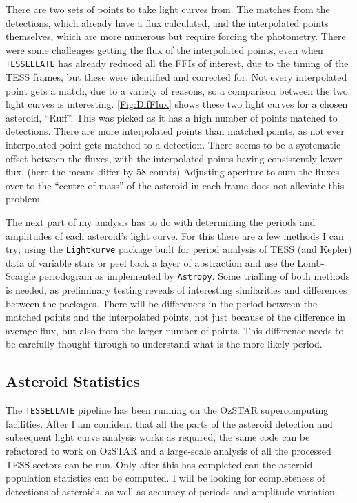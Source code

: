 \documentclass[12pt]{article}
\begin{document}
There are two sets of points to take light curves from. 
The matches from the detections, which already have a flux calculated, and the interpolated points themselves, which are more numerous but require forcing the photometry. 
There were some challenges getting the flux of the interpolated points, even when \texttt{TESSELLATE} has already reduced all the FFIs of interest, due to the timing of the TESS frames, but these were identified and corrected for.
Not every interpolated point gets a match, due to a variety of reasons, %
so a comparison between the two light curves is interesting. 
\autoref{Fig:DifFlux} shows these two light curves for a chosen asteroid, ``Ruff''. 
This was picked as it has a high number of points matched to detections.
There are more interpolated points than matched points, as not ever interpolated point gets matched to a detection.
There seems to be a systematic offset between the fluxes, with the interpolated points having consistently lower flux, (here the means differ by 58 counts)
Adjusting aperture to sum the fluxes over to the ``centre of mass'' of the asteroid in each frame does not alleviate this problem. 

The next part of my analysis has to do with determining the periods and amplitudes of each asteroid's light curve.
For this there are a few methods I can try; using the \texttt{Lightkurve} \citep{Lightkurve2018} package built for period analysis of TESS (and Kepler) data of variable stars or peel back a layer of abstraction and use the Lomb-Scargle periodogram as implemented by \texttt{Astropy}\cite{Astropy2022}. 
Some trialling of both methods is needed, as preliminary testing reveals of interesting similarities and differences between the packages. 
There will be differences in the period between the matched points and the interpolated points, not just because of the difference in average flux, but also from the larger number of points. This difference needs to be carefully thought through to understand what is the more likely period.

\subsection{Asteroid Statistics}\label{SubSec:StatMeth}

The \texttt{TESSELLATE} pipeline has been running on the OzSTAR supercomputing facilities. 
After I am confident that all the parts of the asteroid detection and subsequent light curve analysis works as required, the same code can be refactored to work on OzSTAR and a large-scale analysis of all the processed TESS sectors can be run. 
Only after this has completed can the asteroid population statistics can be computed. 
I will be looking for completeness of detections of asteroids, as well as accuracy of periods and amplitude variation.
\end{document}
